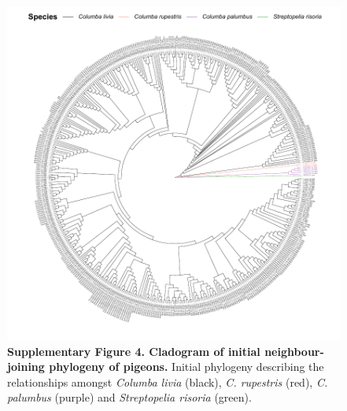 \documentclass[twoside, british, a4paper]{article}
\begin{document}
\begin{figure}
\centering
\includegraphics[width=1\textwidth]{../FPG--Pipeline/FPG--Plots/FPG--Phylogenies/FPG--Phylogeny--Dataset_I.pdf}
\captionsetup{labelformat=empty}
\caption[\textbf{Supplementary Figure 4. Cladogram of initial neighbour-joining phylogeny of pigeons.}]{\textbf{Supplementary Figure 4. Cladogram of initial neighbour-joining phylogeny of pigeons.} Initial phylogeny describing the relationships amongst \textit{Columba livia} (black), \textit{C. rupestris} (red), \textit{C. palumbus} (purple) and \textit{Streptopelia risoria} (green).}
\label{SI:FPG--Phylogeny--Dataset_I}
\end{figure}
\end{document}
